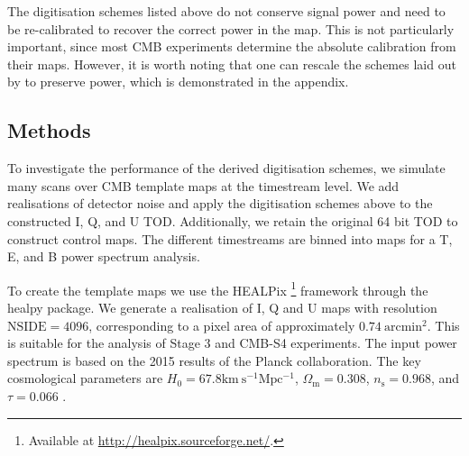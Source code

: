 \documentclass[apj]{emulateapj}
\begin{document}
The digitisation schemes listed above do not conserve signal power and need to be re-calibrated to recover the correct power in the map. This is not particularly important, since most CMB experiments determine the absolute calibration from their maps. However, it is worth noting that one can rescale the schemes laid out by \cite{max1960} to preserve power, which is demonstrated in the appendix.


\subsection{Methods}
\label{subsec:method}

To investigate the performance of the derived digitisation schemes, we simulate many scans over CMB template maps at the timestream level. We add realisations of detector noise and apply the digitisation schemes above to the constructed I, Q, and U TOD. Additionally, we retain the original 64 bit TOD to construct control maps. The different timestreams are binned into maps for a T, E, and B power spectrum analysis.


To create the template maps we use the HEALPix \citep{healpix}\footnote{Available at \url{http://healpix.sourceforge.net/}.} framework through the healpy package. We generate a realisation of I, Q and U maps with resolution $\mathrm{NSIDE} = 4096$, corresponding to a pixel area of approximately $0.74 \> \mathrm{arcmin^2}$. This is suitable for the analysis of Stage 3 and CMB-S4 experiments. The input power spectrum is based on the 2015 results of the Planck collaboration. The key cosmological parameters are $H_0 = 67.8 \mathrm{km \> s^{-1} Mpc^{-1}}$, $\Omega_{\mathrm{m}} = 0.308 $, $n_{\mathrm{s}} = 0.968$, and $\tau = 0.066$ \citep{planck2016}.
\end{document}
